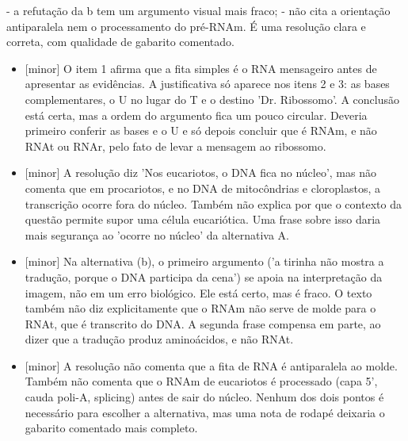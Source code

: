 \documentclass{article}%
\begin{document}
{-} a refutação da b tem um argumento visual mais fraco;\newline%
{-} não cita a orientação antiparalela nem o processamento do pré{-}RNAm.\newline%
\newline%
É uma resolução clara e correta, com qualidade de gabarito comentado.%
\begin{itemize}%
\item%
{[}minor{]} O item 1 afirma que a fita simples é o RNA mensageiro antes de apresentar as evidências. A justificativa só aparece nos itens 2 e 3: as bases complementares, o U no lugar do T e o destino 'Dr. Ribossomo'. A conclusão está certa, mas a ordem do argumento fica um pouco circular. Deveria primeiro conferir as bases e o U e só depois concluir que é RNAm, e não RNAt ou RNAr, pelo fato de levar a mensagem ao ribossomo.%
\item%
{[}minor{]} A resolução diz 'Nos eucariotos, o DNA fica no núcleo', mas não comenta que em procariotos, e no DNA de mitocôndrias e cloroplastos, a transcrição ocorre fora do núcleo. Também não explica por que o contexto da questão permite supor uma célula eucariótica. Uma frase sobre isso daria mais segurança ao 'ocorre no núcleo' da alternativa A.%
\item%
{[}minor{]} Na alternativa (b), o primeiro argumento ('a tirinha não mostra a tradução, porque o DNA participa da cena') se apoia na interpretação da imagem, não em um erro biológico. Ele está certo, mas é fraco. O texto também não diz explicitamente que o RNAm não serve de molde para o RNAt, que é transcrito do DNA. A segunda frase compensa em parte, ao dizer que a tradução produz aminoácidos, e não RNAt.%
\item%
{[}minor{]} A resolução não comenta que a fita de RNA é antiparalela ao molde. Também não comenta que o RNAm de eucariotos é processado (capa 5', cauda poli{-}A, splicing) antes de sair do núcleo. Nenhum dos dois pontos é necessário para escolher a alternativa, mas uma nota de rodapé deixaria o gabarito comentado mais completo.%
\end{itemize}%
\end{document}
